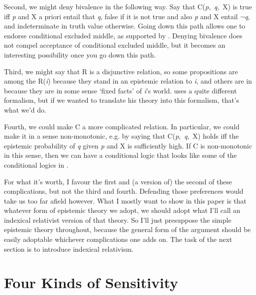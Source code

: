 Second, we might deny bivalence in the following way. Say that C(\textit{p},~\textit{q},~X) is true iff \textit{p} and X a priori entail that \textit{q}, false if it is not true and also \textit{p} and X entail \(\neg\){}\textit{q}, and indeterminate in truth value otherwise. Going down this path allows one to endorse conditional excluded middle, as supported by \citet{Stalnaker1981}. Denying bivalence does not compel acceptance of conditional excluded middle, but it becomes an interesting possibility once you go down this path.

Third, we might say that R is a disjunctive relation, so some propositions are among the R(\textit{i}) because they stand in an epistemic relation to \textit{i}, and others are in because they are in some sense `fixed facts' of \textit{i}'s world. \citet{Nolan2003} uses a quite different formalism, but if we wanted to translate his theory into this formalism, that's what we'd do.

Fourth, we could make C a more complicated relation. In particular, we could make it in a sense non-monotonic, e.g. by saying that C(\textit{p},~\textit{q},~X) holds iff the epistemic probability of \textit{q} given \textit{p} and X is sufficiently high. If C is non-monotonic in this sense, then we can have a conditional logic that looks like some of the conditional logics in \citet{Lewis1973a}.

For what it's worth, I favour the first and (a version of) the second of these complications, but not the third and fourth. Defending those preferences would take us too far afield however. What I mostly want to show in this paper is that whatever form of epistemic theory we adopt, we should adopt what I'll call an indexical relativist version of that theory. So I'll just presuppose the simple epistemic theory throughout, because the general form of the argument should be easily adoptable whichever complications one adds on. The task of the next section is to introduce indexical relativism.


\section{Four Kinds of Sensitivity}

